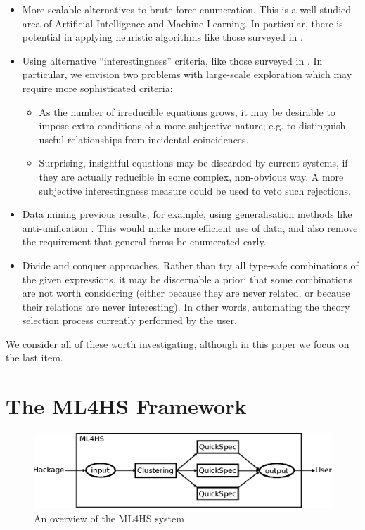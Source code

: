 \documentclass{eceasst}
\begin{document}
\begin{itemize}
\item
  More scalable alternatives to brute-force enumeration. This is a well-studied
  area of Artificial Intelligence and Machine Learning. In particular, there is
  potential in applying heuristic algorithms like those surveyed in
  \cite{blum2011hybrid}.
\item
  Using alternative ``interestingness'' criteria, like those surveyed in
  \cite{geng2006interestingness}. In particular, we envision two problems with
  large-scale exploration which may require more sophisticated criteria:

  \begin{itemize}
  \item
    As the number of irreducible equations grows, it may be desirable to
    impose extra conditions of a more subjective nature; e.g. to distinguish
    useful relationships from incidental coincidences.
  \item
    Surprising, insightful equations may be discarded by current systems, if
    they are actually reducible in some complex, non-obvious way. A more
    subjective interestingness measure could be used to veto such
    rejections.
  \end{itemize}
\item
  Data mining previous results; for example, using generalisation methods like
  anti-unification \cite{bulychev2010anti}. This would make more efficient use
  of data, and also remove the requirement that general forms be enumerated
  early.
\item
  Divide and conquer approaches. Rather than try all type-safe combinations of
  the given expressions, it may be discernable a priori that some combinations
  are not worth considering (either because they are never related, or because
  their relations are never interesting). In other words, automating the theory
  selection process currently performed by the user.
\end{itemize}

We consider all of these worth investigating, although in this paper we
focus on the last item.

\section{The \textsc{ML4HS} Framework}\label{ml4hs}

\begin{figure}
  \centering
  \includegraphics[]{ml4hs}
  \caption{An overview of the \textsc{ML4HS} system}
  \label{ml4hsdia}
\end{figure}
\end{document}
